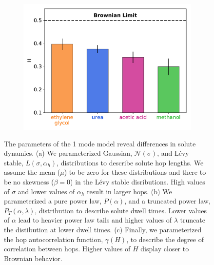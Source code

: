 \documentclass[12pt]{article}
\begin{document}
\begin{figure}
\begin{subfigure}{0.325\textwidth}
  \includegraphics[width=\textwidth]{hurst_barchart.pdf}
  \caption{}\label{fig:hurst_barchart}
  \end{subfigure}
  \caption{The parameters of the 1 mode model reveal differences in solute dynamics.
  (a) We parameterized Gaussian, $\mathcal{N}(\sigma)$, and L\'evy stable, 
  $L(\sigma, \alpha_h)$, distributions to describe solute hop lengths. We assume the 
  mean ($\mu$) to be zero for these distributions and there to be no skewness ($\beta = 0$)
  in the L\'evy stable disributions. High values of $\sigma$ and lower values of $\alpha_h$
  result in larger hops. (b) We parameterized a pure power law, $P(\alpha)$, and a 
  truncated power law, $P_T(\alpha, \lambda)$, distribution to describe solute dwell
  times. Lower values of $\alpha$ lead to heavier power law tails and higher values of 
  $\lambda$ truncate the distibution at lower dwell times. (c) Finally, we parameterized the
  hop autocorrelation function, $\gamma(H)$, to describe the degree of correlation between
  hops. Higher values of $H$ display closer to Brownian behavior.}\label{fig:1mode_parameters}
  \end{figure}
  
\end{document}
